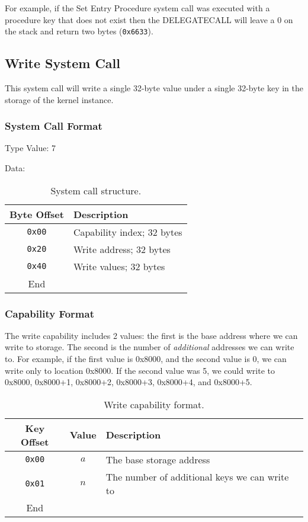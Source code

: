 \documentclass[english,a4paper]{article}
\let\oldparagraph\subsubsection
\renewcommand{\subsubsection}[1]{\oldparagraph{#1}\mbox{}}
\begin{document}
For example, if the Set Entry
Procedure system call was executed with a procedure key that does not exist then
the DELEGATECALL will leave a 0 on the stack and return two bytes
(\texttt{0x6633}).

\subsection{Write System Call}
This system call will write a single 32-byte value under a single 32-byte key in
the storage of the kernel instance.

\subsubsection{System Call Format}
Type Value: 7

Data:

\begin{table}[H]
  \caption{System call structure.}
  \centering{}%
  \begin{tabularx}{\textwidth}{c|X}
    \hline
    Byte Offset & Description\\
    \hline
    \hline
    \texttt{0x00} & Capability index; 32 bytes \\
    \texttt{0x20} & Write address; 32 bytes \\
    \texttt{0x40} & Write values; 32 bytes \\
    \hline
    End &  \\
    \hline
  \end{tabularx}
\end{table}

\subsubsection{Capability Format}
The write capability includes 2 values: the first is the base address where we
can write to storage. The second is the number of \emph{additional} addresses we
can write to. For example, if the first value is 0x8000, and the second value is
0, we can write only to location 0x8000. If the second value was 5, we could
write to 0x8000, 0x8000+1, 0x8000+2, 0x8000+3, 0x8000+4, and 0x8000+5.

\begin{table}[H]
  \caption{Write capability format.}
  \centering{}%
  \begin{tabularx}{\textwidth}{c|c|X}
    \hline
    Key Offset & Value & Description\\
    \hline
    \hline
    \texttt{0x00} & $a$ & The base storage address\\
    \texttt{0x01} & $n$ & The number of additional keys we can write to\\
    \hline
    End &  \\
    \hline
  \end{tabularx}
\end{table}
\end{document}
